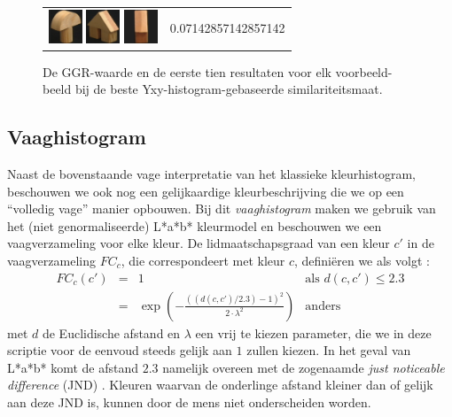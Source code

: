 \begin{figure}[tbp]
\begin{center}
\begin{tabular}{m{11cm} | m{3cm} |}
\includegraphics[width=1cm]{coil/beeld-3.eps}
\includegraphics[width=1cm]{coil/beeld-46.eps}
\includegraphics[width=1cm]{coil/beeld-44.eps}
& {\scriptsize 0.07142857142857142}
\end{tabular}
\caption{\label{fig:results_yxy_histgeb}De GGR-waarde en de eerste tien resultaten voor elk voorbeeld-beeld bij de beste Yxy-histogram-gebaseerde similariteitsmaat.}
\end{center}
\end{figure}




\subsection{Vaaghistogram}

Naast de bovenstaande vage interpretatie van het klassieke kleurhistogram, beschouwen we
ook nog een gelijkaardige kleurbeschrijving die we op een ``volledig vage'' manier opbouwen. Bij dit
\emph{vaaghistogram} maken we gebruik van het (niet genormaliseerde) L*a*b* kleurmodel en 
beschouwen we een vaagverzameling voor elke kleur. 
De lidmaatschapsgraad van een kleur $c'$ in de vaagverzameling 
$FC_c$, die correspondeert met kleur $c$, defini\"eren we als volgt \cite{vertan:fuzzy_histograms}: 
$$
\begin{array}{rcll}
FC_c(c') & = & 1 & \textrm{als } d(c,c') \leq 2.3 \\
		 & = & \exp \left( - \frac{\left((d(c,c') / 2.3) - 1\right)^2}{2 \cdot \lambda^2} \right) & \textrm{anders}
\end{array}
$$  
met $d$ de Euclidische afstand en $\lambda$ een vrij te kiezen parameter, die we in deze scriptie
voor de eenvoud steeds gelijk aan $1$ zullen kiezen. In het geval van L*a*b* 
komt de afstand $2.3$ namelijk overeen met de zogenaamde \emph{just noticeable difference} (JND)
\cite{sharma:digital_color_imaging}. 
Kleuren waarvan de onderlinge afstand kleiner dan of gelijk aan deze JND is, kunnen door de mens 
niet onderscheiden worden.

